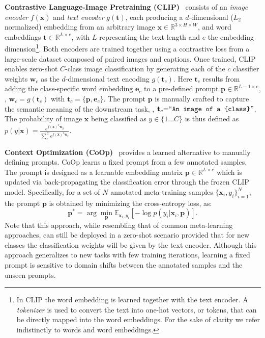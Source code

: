 \documentclass[10pt,twocolumn,letterpaper]{article}
\newcommand{\x}{\mathbf{x}}
\newcommand{\txt}{\mathbf{t}}
\newcommand{\w}{\mathbf{w}}
\newcommand{\e}{\mathbf{e}}
\newcommand{\p}{\mathbf{p}}
\begin{document}
\textbf{Contrastive Language-Image Pretraining (CLIP)}~\cite{clip_icml21} consists of an \textit{image encoder} $f(\x)$ and \textit{text encoder} $g(\txt)$, each producing a $d$-dimensional ($L_2$ normalized) embedding from an arbitrary image $\x \in \mathbb{R}^{3 \times H \times W}$, and word embeddings $\txt \in \mathbb{R}^{L \times e}$, with $L$ representing the text length and $e$ the embedding dimension\footnote{In CLIP the word embedding is learned together with the text encoder. A \textit{tokenizer} is used to convert the text into one-hot vectors, or tokens, that can be directly mapped into the word embeddings. For the sake of clarity we refer indistinctly to words and word embeddings.}. Both encoders are trained together using a contrastive loss from a large-scale dataset composed of paired images and captions. Once trained, CLIP enables zero-shot $C$-class image classification by generating each of the $c$ classifier weights $\w_c$ as the $d$-dimensional text encoding $g(\txt_c)$. Here $\txt_c$ results from adding the class-specific word embedding $\e_c$ to a pre-defined prompt $\p \in \mathbb{R}^{L-1 \times e}$, \ie, $\w_c {=} g(\txt_c)$ with $\txt_c {=} \{\p,\e_c\}$. The prompt $\p$ is manually crafted to capture the semantic meaning of the downstream task, \eg, $\txt_c {=} ``\texttt{An image of a \{class\}}"$. The probability of image $\x$ being classified as $y \in \{1...C\}$ is thus defined as 
$p(y|\x) {=} \frac{e^{f(\x)^T\w_y}}{\sum_{c}^C e^{f(\x)^T \w_{c}}}$. 


\textbf{Context Optimization (CoOp)}~\cite{zhou2022learning} provides a learned alternative to manually defining prompts. CoOp learns a fixed prompt from a few annotated samples. The prompt is designed as a learnable embedding matrix $\p \in \mathbb{R}^{L \times e}$ which is updated via back-propagating the classification error through the frozen CLIP model. Specifically, for a set of $N$ annotated meta-training samples $\{\x_i, y_i\}_{i=1}^N$, the prompt $\p$ is obtained by minimizing the cross-entropy loss, as:
\begin{equation}
\label{eq:coop}
   \p^* = \arg \min_\p \mathbb{E}_{\x_i,y_i} [-\log p(y_i | \x_i, \p)].
\end{equation}
Note that this approach, while resembling that of common meta-learning approaches, can still be deployed in a zero-shot scenario provided that for new classes the classification weights will be given by the text encoder. Although this approach generalizes to new tasks with few training iterations, learning a fixed prompt is sensitive to domain shifts between the annotated samples and the unseen prompts. 
\end{document}
